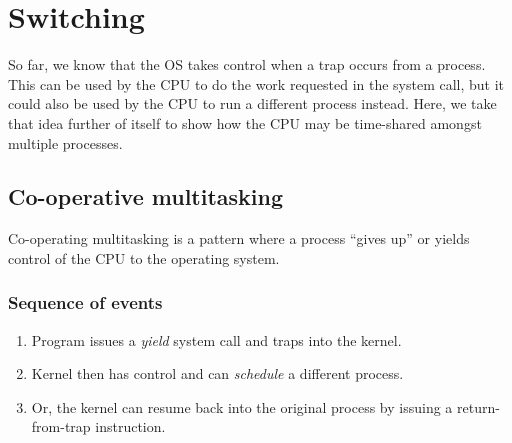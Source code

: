 \chapter{Switching}
\label{ch:switching}



So far, we know that the OS takes control when a trap occurs from a process.
This can be used by the CPU to do the work requested in the system call, but it could also be used by the CPU to run a different process instead.
Here, we take that idea further of itself to show how the CPU may be time-shared amongst multiple processes.

\section{Co-operative multitasking}

Co-operating multitasking is a pattern where a process ``gives up'' or yields control of the CPU to the operating system.

\subsection{Sequence of events}

\begin{enumerate}
\item Program issues a \textit{yield} system call and traps into the kernel.
\item Kernel then has control and can \textit{schedule} a different process.
\item Or, the kernel can resume back into the original process by issuing a return-from-trap instruction.
\end{enumerate}


